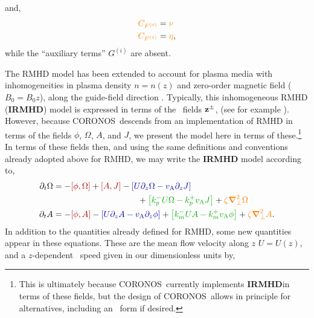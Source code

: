 \documentclass[12pt, letterpaper, oneside, leqno, openright]{memoir}
\newcommand{\irmhd}{\textbf{IRMHD}}
\newcommand{\coronos}{\textsf{CORONOS}}
\begin{document}
%
and,
%
\begin{subequations}
\begin{align}
  {\color{orange}C_{F^{(0)}}} &={\color{orange}\nu }  \label{eq:rmhdczero} \\
  {\color{orange}C_{F^{(1)}}} &={\color{orange}\eta}, \label{eq:rmhdcone}
\end{align}
\end{subequations}
%
while the ``auxiliary terms'' {\color{green!65!black}$G^{(i)}$} are
absent.
%
\par
%
The RMHD model has been extended to account for plasma media with
inhomogeneities in plasma density $n=n(z)$ and zero-order magnetic 
field ($B_0= B_0{z}$), along the guide-field direction 
\citep{HeinemannOlbert80, Vellietal89}.
Typically, this inhomogeneous RMHD (\irmhd) model is expressed in
terms of the \elsasser\ fields $\mathbf{z}^\pm$, 
(see for example \citet{PerezChandran2013}). However, because \coronos\
descends from an implementation of RMHD in terms of the fields
$\phi$, $\Omega$, $A$, and $J$, we present the model here in terms
of these.\footnote{This is ultimately because \coronos\ currently 
implements \irmhd in terms of these fields, but the design of \coronos\ allows 
in principle for alternatives, including an \elsasser\ form if desired.}
In terms of these fields then, and using the same definitions
and conventions already adopted above for RMHD, we may write the \irmhd
model according to,
%
\begin{subequations}
%
  \begin{align}
    \pardt\Omega &=
    - {\color{red!65!black}[\phi,\Omega]} + {\color{red!65!black}[A,J]}
    - {\color{blue!65!black}\left[U\pardz\Omega - \magvalfven\pardz J\right]} \nonumber \\ 
    & \qquad\qquad\qquad\qquad\qquad + {\color{green!65!black}\left[\kpm U\Omega - \kpp\magvalfven J\right]} 
    + {\color{orange}\zeta\delperp^2\Omega}
    \label{eq:ihomega}  \\
%
    \pardt A     &=
    - {\color{red!65!black}[\phi,A]}
    - {\color{blue!65!black}\left[U\pardz A  - \magvalfven\pardz\phi\right]}
    + {\color{green!65!black}\left[\kmm U A  - \kmp\magvalfven\phi\right]}
    + {\color{orange}\zeta\delperp^2A}.
    \label{eq:iha}
  \end{align}
\end{subequations}
%
In addition to the quantities already defined for RMHD, some new quantities
appear in these equations. These are the mean flow velocity along $z$ $U=U(z)$,
and a $z$-dependent \Alfven\ speed given in our dimensionless units by,
\end{document}
